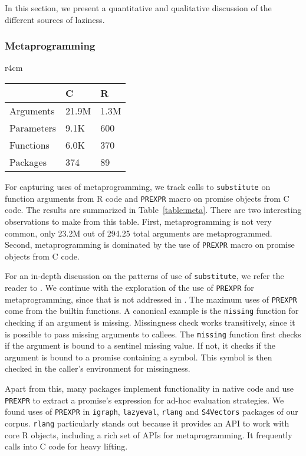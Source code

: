 \documentclass[review,nonacm,screen,acmsmall,anonymous=true]{acmart}
\newcommand{\code}[1]{\lstinline |#1|\xspace}
\begin{document}
In this section, we present a quantitative and qualitative discussion of the
different sources of laziness.

\subsubsection{Metaprogramming}

\begin{wraptable}{r}{4cm}
  \vspace{-3mm}
  \small
  \caption{Metaprogramming} \label{table:meta}
  \centering
  \begin{tabular}{lll}
    \toprule
    &\textbf{C}&\textbf{R}\\
    \midrule
    Arguments&21.9M&1.3M\\
    Parameters&9.1K&600\\
    Functions&6.0K&370\\
    Packages&374&89\\
    \bottomrule
  \end{tabular}
\end{wraptable}

For capturing uses of metaprogramming, we track calls to \code{substitute} on
function arguments from R code and \code{PREXPR} macro on promise objects from C
code. The results are summarized in Table~\ref{table:meta}. There are two
interesting observations to make from this table. First, metaprogramming is not
very common, only 23.2M out of 294.25 total arguments are metaprogrammed.
Second, metaprogramming is dominated by the use of \code{PREXPR} macro on
promise objects from C code.

For an in-depth discussion on the patterns of use of \code{substitute}, we refer
the reader to \citet{oopsla19b}. We continue with the exploration of the use of
\code{PREXPR} for metaprogramming, since that is not addressed in
\cite{oopsla19b}. The maximum uses of \code{PREXPR} come from the builtin
functions.
A canonical example is the \code{missing} function for checking if an
argument is missing. Missingness check works transitively, since it is possible
to pass missing arguments to callees. The \code{missing} function first checks
if the argument is bound to a sentinel missing value. If not, it checks if the
argument is bound to a promise containing a symbol. This symbol is then checked
in the caller's environment for missingness.

Apart from this, many packages implement functionality in native code and use
\code{PREXPR} to extract a promise's expression for ad-hoc evaluation
strategies. We found uses of \code{PREXPR} in \code{igraph}, \code{lazyeval},
\code{rlang} and \code{S4Vectors} packages of our corpus. \code{rlang}
particularly stands out because it provides an API to work with core R objects,
including a rich set of APIs for metaprogramming. It frequently calls into C
code for heavy lifting.
\end{document}

